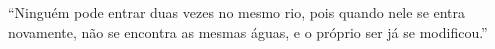 ``Ninguém pode entrar duas vezes no mesmo rio, pois quando nele se entra novamente, não se encontra as mesmas águas, e o próprio ser já se modificou.''

